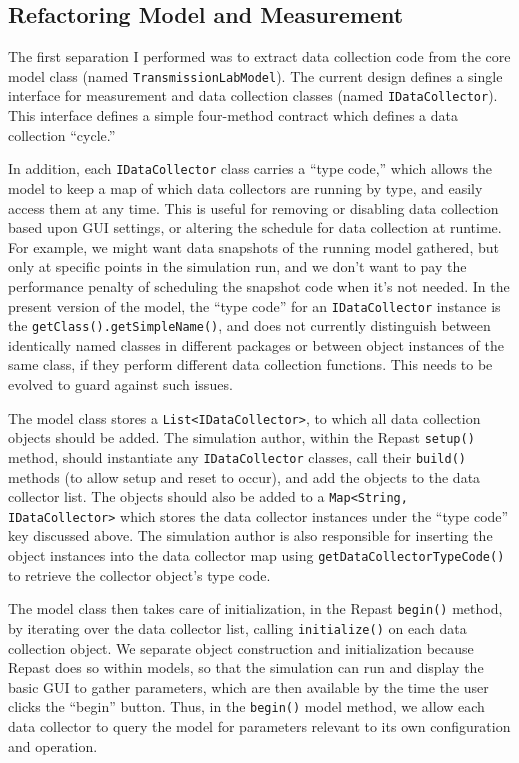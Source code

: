 \documentclass[noid]{kluwer-mem-proposal}
\begin{document}
\begin{article}
\subsection{Refactoring Model and Measurement}
The first separation I performed was to extract data collection code from
the core model class (named \texttt{TransmissionLabModel}).  The current design
defines a single interface for measurement and data collection classes (named
\texttt{IDataCollector}).  This interface defines a simple four-method contract
which defines a data collection ``cycle.''  

In addition, each \texttt{IDataCollector} class carries a ``type code,'' which
allows the model to keep a map of which data collectors are running by type, and
easily access them at any time.  This is useful for removing or disabling data
collection based upon GUI settings, or altering the schedule for data collection
at runtime.  For example, we might want data snapshots of the running model
gathered, but only at specific points in the simulation run, and we don't want
to pay the performance penalty of scheduling the snapshot code when it's not
needed.  In the present version of the model, the ``type code'' for an
\texttt{IDataCollector} instance is the \texttt{getClass().getSimpleName()}, and
does not currently distinguish between identically named classes in different
packages or between object instances of the same class, if they perform
different data collection functions.  This needs to be evolved to guard against
such issues.

The model class stores a 
\texttt{List<IDataCollector>}, to which all data collection objects should be
added.  The simulation author, within the Repast \texttt{setup()} method, 
should instantiate any \texttt{IDataCollector} classes, call
their \texttt{build()} methods (to allow setup and reset to occur), and add the
objects to the data collector list.  The objects should also be added to a
\texttt{Map<String, IDataCollector>} which stores the data collector instances
under the ``type code'' key discussed above.  The simulation author is also
responsible for inserting the object instances into the data collector map using
\texttt{getDataCollectorTypeCode()} to retrieve the collector object's type code. 

The model class then takes care of initialization, in the Repast
 \texttt{begin()} method, by iterating over the data collector list, calling
\texttt{initialize()} on each data collection object.  We separate object
construction and initialization because Repast does so within models, so that
the simulation can run and display the basic GUI to gather parameters,
which are then available by the time the user clicks the ``begin'' button. 
Thus, in the \texttt{begin()} model method, we allow each data collector to
query the model for parameters relevant to its own configuration and operation.


\end{article}
\end{document}
